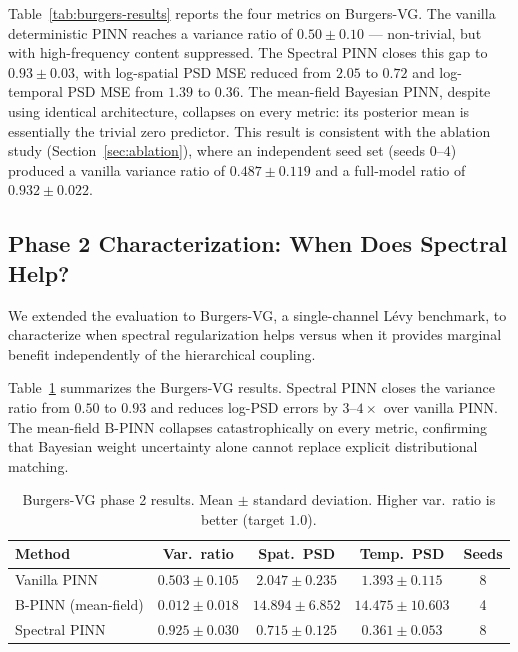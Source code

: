 \documentclass[times,12pt]{elsarticle}
\begin{document}
Table~\ref{tab:burgers-results} reports the four metrics on Burgers-VG.
The vanilla deterministic PINN reaches a variance ratio of $0.50 \pm 0.10$ ---
non-trivial, but with high-frequency content suppressed. The Spectral PINN
closes this gap to $0.93 \pm 0.03$, with log-spatial PSD MSE reduced from
$2.05$ to $0.72$ and log-temporal PSD MSE from $1.39$ to $0.36$.
The mean-field Bayesian PINN, despite using identical architecture, collapses
on every metric: its posterior mean is essentially the trivial zero predictor.
This result is consistent with the ablation study (Section~\ref{sec:ablation}),
where an independent seed set (seeds $0$--$4$) produced a vanilla variance
ratio of $0.487 \pm 0.119$ and a full-model ratio of $0.932 \pm 0.022$.

\subsection{Phase 2 Characterization: When Does Spectral Help?}
\label{sec:phase2}

We extended the evaluation to Burgers-VG, a single-channel L\'evy benchmark, to
characterize when spectral regularization helps versus when it provides marginal
benefit independently of the hierarchical coupling.

Table~\ref{tab:phase2} summarizes the Burgers-VG results. Spectral PINN closes
the variance ratio from $0.50$ to $0.93$ and reduces log-PSD errors by
$3$--$4\times$ over vanilla PINN. The mean-field B-PINN collapses catastrophically
on every metric, confirming that Bayesian weight uncertainty alone cannot
replace explicit distributional matching.

\begin{table}[h]
\centering
\caption{Burgers-VG phase 2 results. Mean $\pm$ standard deviation. Higher var.\ ratio is better (target $1.0$).}
\label{tab:phase2}
\begin{tabular}{lcccc}
\toprule
Method & Var.\ ratio & Spat.\ PSD & Temp.\ PSD & Seeds \\
\midrule
Vanilla PINN & $0.503 \pm 0.105$ & $2.047 \pm 0.235$ & $1.393 \pm 0.115$ & 8 \\
B-PINN (mean-field) & $0.012 \pm 0.018$ & $14.894 \pm 6.852$ & $14.475 \pm 10.603$ & 4 \\
Spectral PINN & $\mathbf{0.925 \pm 0.030}$ & $\mathbf{0.715 \pm 0.125}$ & $\mathbf{0.361 \pm 0.053}$ & 8 \\
\bottomrule
\end{tabular}
\end{table}
\end{document}
